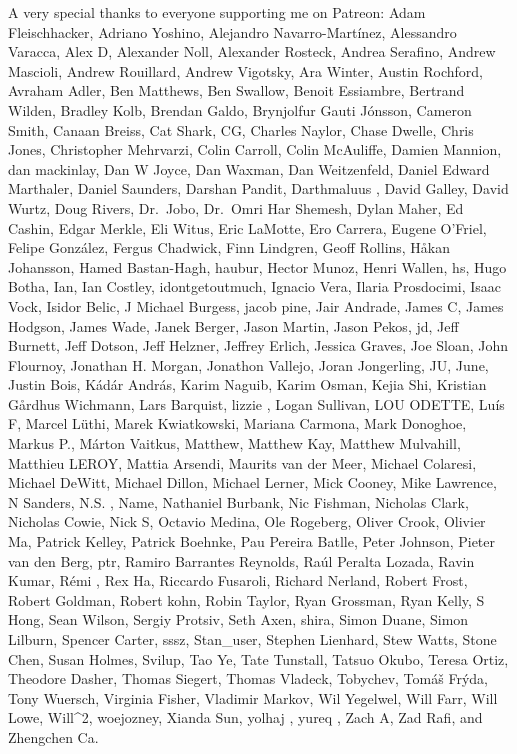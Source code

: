 \documentclass[
  letterpaper,
  DIV=11,
  numbers=noendperiod]{scrartcl}
\begin{document}
A very special thanks to everyone supporting me on Patreon: Adam
Fleischhacker, Adriano Yoshino, Alejandro Navarro-Martínez, Alessandro
Varacca, Alex D, Alexander Noll, Alexander Rosteck, Andrea Serafino,
Andrew Mascioli, Andrew Rouillard, Andrew Vigotsky, Ara Winter, Austin
Rochford, Avraham Adler, Ben Matthews, Ben Swallow, Benoit Essiambre,
Bertrand Wilden, Bradley Kolb, Brendan Galdo, Brynjolfur Gauti Jónsson,
Cameron Smith, Canaan Breiss, Cat Shark, CG, Charles Naylor, Chase
Dwelle, Chris Jones, Christopher Mehrvarzi, Colin Carroll, Colin
McAuliffe, Damien Mannion, dan mackinlay, Dan W Joyce, Dan Waxman, Dan
Weitzenfeld, Daniel Edward Marthaler, Daniel Saunders, Darshan Pandit,
Darthmaluus , David Galley, David Wurtz, Doug Rivers, Dr.~Jobo, Dr.~Omri
Har Shemesh, Dylan Maher, Ed Cashin, Edgar Merkle, Eli Witus, Eric
LaMotte, Ero Carrera, Eugene O'Friel, Felipe González, Fergus Chadwick,
Finn Lindgren, Geoff Rollins, Håkan Johansson, Hamed Bastan-Hagh,
haubur, Hector Munoz, Henri Wallen, hs, Hugo Botha, Ian, Ian Costley,
idontgetoutmuch, Ignacio Vera, Ilaria Prosdocimi, Isaac Vock, Isidor
Belic, J Michael Burgess, jacob pine, Jair Andrade, James C, James
Hodgson, James Wade, Janek Berger, Jason Martin, Jason Pekos, jd, Jeff
Burnett, Jeff Dotson, Jeff Helzner, Jeffrey Erlich, Jessica Graves, Joe
Sloan, John Flournoy, Jonathan H. Morgan, Jonathon Vallejo, Joran
Jongerling, JU, June, Justin Bois, Kádár András, Karim Naguib, Karim
Osman, Kejia Shi, Kristian Gårdhus Wichmann, Lars Barquist, lizzie ,
Logan Sullivan, LOU ODETTE, Luís F, Marcel Lüthi, Marek Kwiatkowski,
Mariana Carmona, Mark Donoghoe, Markus P., Márton Vaitkus, Matthew,
Matthew Kay, Matthew Mulvahill, Matthieu LEROY, Mattia Arsendi, Maurits
van der Meer, Michael Colaresi, Michael DeWitt, Michael Dillon, Michael
Lerner, Mick Cooney, Mike Lawrence, N Sanders, N.S. , Name, Nathaniel
Burbank, Nic Fishman, Nicholas Clark, Nicholas Cowie, Nick S, Octavio
Medina, Ole Rogeberg, Oliver Crook, Olivier Ma, Patrick Kelley, Patrick
Boehnke, Pau Pereira Batlle, Peter Johnson, Pieter van den Berg, ptr,
Ramiro Barrantes Reynolds, Raúl Peralta Lozada, Ravin Kumar, Rémi , Rex
Ha, Riccardo Fusaroli, Richard Nerland, Robert Frost, Robert Goldman,
Robert kohn, Robin Taylor, Ryan Grossman, Ryan Kelly, S Hong, Sean
Wilson, Sergiy Protsiv, Seth Axen, shira, Simon Duane, Simon Lilburn,
Spencer Carter, sssz, Stan\_user, Stephen Lienhard, Stew Watts, Stone
Chen, Susan Holmes, Svilup, Tao Ye, Tate Tunstall, Tatsuo Okubo, Teresa
Ortiz, Theodore Dasher, Thomas Siegert, Thomas Vladeck, Tobychev, Tomáš
Frýda, Tony Wuersch, Virginia Fisher, Vladimir Markov, Wil Yegelwel,
Will Farr, Will Lowe, Will\^{}2, woejozney, Xianda Sun, yolhaj , yureq ,
Zach A, Zad Rafi, and Zhengchen Ca.
\end{document}
